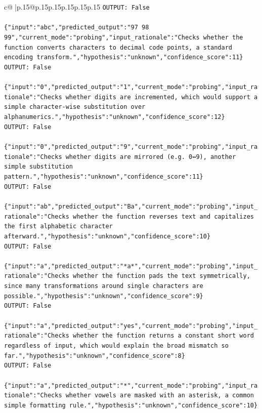 \documentclass{article}
\begin{document}
{\begin{supertabular}{c@{$\;$}|p{.15\linewidth}@{}p{.15\linewidth}p{.15\linewidth}p{.15\linewidth}p{.15\linewidth}p{.15\linewidth}}
{{{\texttt{OUTPUT: False} \\
\\ 
\texttt{\{"input":"abc","predicted\_output":"97 98 99","current\_mode":"probing","input\_rationale":"Checks whether the function converts characters to decimal code points, a standard encoding transform.","hypothesis":"unknown","confidence\_score":11\}} \\
\texttt{OUTPUT: False} \\
\\ 
\texttt{\{"input":"0","predicted\_output":"1","current\_mode":"probing","input\_rationale":"Checks whether digits are incremented, which would support a simple character{-}wise substitution over alphanumerics.","hypothesis":"unknown","confidence\_score":12\}} \\
\texttt{OUTPUT: False} \\
\\ 
\texttt{\{"input":"0","predicted\_output":"9","current\_mode":"probing","input\_rationale":"Checks whether digits are mirrored (e.g. 0↔9), another simple substitution pattern.","hypothesis":"unknown","confidence\_score":11\}} \\
\texttt{OUTPUT: False} \\
\\ 
\texttt{\{"input":"ab","predicted\_output":"Ba","current\_mode":"probing","input\_rationale":"Checks whether the function reverses text and capitalizes the first alphabetic character afterward.","hypothesis":"unknown","confidence\_score":10\}} \\
\texttt{OUTPUT: False} \\
\\ 
\texttt{\{"input":"a","predicted\_output":"*a*","current\_mode":"probing","input\_rationale":"Checks whether the function pads the text symmetrically, since many transformations around single characters are possible.","hypothesis":"unknown","confidence\_score":9\}} \\
\texttt{OUTPUT: False} \\
\\ 
\texttt{\{"input":"a","predicted\_output":"yes","current\_mode":"probing","input\_rationale":"Checks whether the function returns a constant short word regardless of input, which would explain the broad mismatch so far.","hypothesis":"unknown","confidence\_score":8\}} \\
\texttt{OUTPUT: False} \\
\\ 
\texttt{\{"input":"a","predicted\_output":"*","current\_mode":"probing","input\_rationale":"Checks whether vowels are masked with an asterisk, a common simple formatting rule.","hypothesis":"unknown","confidence\_score":10\}} \\
}}}
\end{supertabular}}
\end{document}
